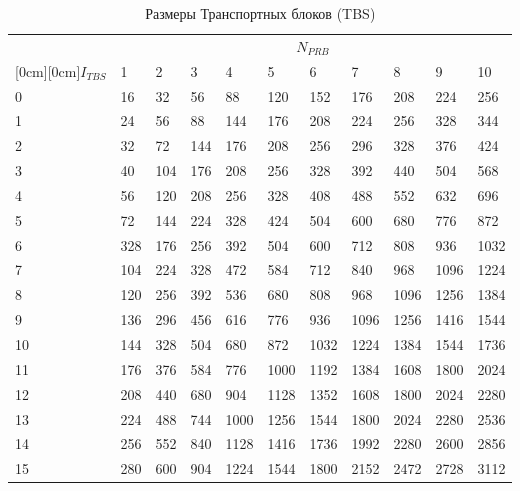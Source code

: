 \clearpage

\begin{table} [htb]
  \centering
\parbox{15cm}{\caption{Размеры Транспортных блоков (TBS)}\label{TBS}}
\begin{center}
    \begin{tabular}{|l||l|l|l|l|l|l|l|l|l|l|}
\hline
& \multicolumn{10}{c|}{$N_{PRB}$} \\
\cline{2-11}
\raisebox{1.5ex}[0cm][0cm]{$I_{TBS}$}
& 1   & 2   & 3    & 4    & 5    & 6    & 7    & 8    & 9    & 10   \\
\hline
\hline
    0    & 16  & 32  & 56   & 88   & 120  & 152  & 176  & 208  & 224  & 256  \\ \hline
    1    & 24  & 56  & 88   & 144  & 176  & 208  & 224  & 256  & 328  & 344  \\ \hline
    2    & 32  & 72  & 144  & 176  & 208  & 256  & 296  & 328  & 376  & 424  \\ \hline
    3    & 40  & 104 & 176  & 208  & 256  & 328  & 392  & 440  & 504  & 568  \\ \hline
    4    & 56  & 120 & 208  & 256  & 328  & 408  & 488  & 552  & 632  & 696  \\ \hline
    5    & 72  & 144 & 224  & 328  & 424  & 504  & 600  & 680  & 776  & 872  \\ \hline
    6    & 328 & 176 & 256  & 392  & 504  & 600  & 712  & 808  & 936  & 1032 \\ \hline
    7    & 104 & 224 & 328  & 472  & 584  & 712  & 840  & 968  & 1096 & 1224 \\ \hline
    8    & 120 & 256 & 392  & 536  & 680  & 808  & 968  & 1096 & 1256 & 1384 \\ \hline
    9    & 136 & 296 & 456  & 616  & 776  & 936  & 1096 & 1256 & 1416 & 1544 \\ \hline
    10   & 144 & 328 & 504  & 680  & 872  & 1032 & 1224 & 1384 & 1544 & 1736 \\ \hline
    11   & 176 & 376 & 584  & 776  & 1000 & 1192 & 1384 & 1608 & 1800 & 2024 \\ \hline
    12   & 208 & 440 & 680  & 904  & 1128 & 1352 & 1608 & 1800 & 2024 & 2280 \\ \hline
    13   & 224 & 488 & 744  & 1000 & 1256 & 1544 & 1800 & 2024 & 2280 & 2536 \\ \hline
    14   & 256 & 552 & 840  & 1128 & 1416 & 1736 & 1992 & 2280 & 2600 & 2856 \\ \hline
    15   & 280 & 600 & 904  & 1224 & 1544 & 1800 & 2152 & 2472 & 2728 & 3112 \\ \hline

\end{tabular}
\end{center}
\end{table}

